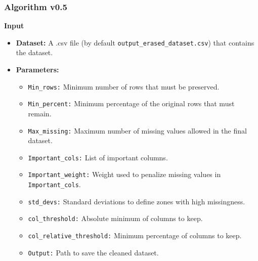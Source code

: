 \documentclass[a4paper,12pt]{article}
\begin{document}
\subsubsection{Algorithm v0.5}
\textbf{Input}
\begin{itemize}
    \item \textbf{Dataset:} A .csv file (by default \texttt{output\_erased\_dataset.csv}) that contains the dataset.
    \item \textbf{Parameters:}
    \begin{itemize}
        \item \texttt{Min\_rows:} Minimum number of rows that must be preserved.
        \item \texttt{Min\_percent:} Minimum percentage of the original rows that must remain.
        \item \texttt{Max\_missing:} Maximum number of missing values allowed in the final dataset.
        \item \texttt{Important\_cols:} List of important columns.
        \item \texttt{Important\_weight:} Weight used to penalize missing values in \texttt{Important\_cols}.
        \item \texttt{std\_devs:} Standard deviations to define zones with high missingness.
        \item \texttt{col\_threshold:} Absolute minimum of columns to keep.
        \item \texttt{col\_relative\_threshold:} Minimum percentage of columns to keep.
        \item \texttt{Output:} Path to save the cleaned dataset.
    \end{itemize}
\end{itemize}
\end{document}
